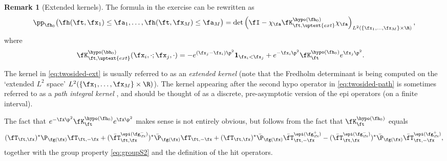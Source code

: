 \documentclass[]{pcmi}
\theoremstyle{plain}
\theoremstyle{definition}
\newtheorem{remark}[equation]{Remark}
\newcommand{\uno}[1]{\mathbf{1}_{#1}}
\begin{document}
\begin{remark}[Extended kernels]
The formula in the exercise can be rewritten as
\begin{equation}\label{eq:twosided-ext}
\pp_{\fh_0} \bigl(\fh(\ft,\fx_1)\leq\fa_1,\ldots,\fh(\ft,\fx_M)\leq\fa_M\bigr)=\det\left(\fI-\chi_{\fa}\fK^{\hypo(\fh_0)}_{\ft,\uptext{ext}}\chi_{\fa}\right)_{L^2(\{\fx_1,\ldots,\fx_M\}\times\R)},
\end{equation}
where
\begin{align}
\fK^{\hypo(\bh_0)}_{\ft,\uptext{ext}}(\fx_i,\cdot;\fx_j,\cdot)&=-e^{(\fx_j-\fx_i)\p^2}\uno{\fx_i<\fx_j}+e^{-\fx_i\p^2}\fK^{\hypo(\fh_0)}_\ft e^{\fx_j\p^2}.\label{eq:Khypo-ext}
\end{align}

The kernel in \eqref{eq:twosided-ext} is usually referred to as an \emph{extended kernel} (note that the Fredholm determinant is being computed on the `extended $L^2$ space' $L^2(\{\fx_1,\ldots,\fx_M\}\times\R)$).
The kernel appearing after the second hypo operator in \eqref{eq:twosided-path} is sometimes referred to as a \emph{path integral kernel} \cite{bcr}, and should be thought of as a discrete, pre-asymptotic version of the epi operators (on a finite interval).

The fact that $e^{-\fx\p^2}\fK^{\hypo(\fh_0)}_{\ft}e^{\fx\p^2}$ makes sense is not entirely obvious, but follows from the fact that
$\fK^{\hypo(\fh_0)}_{\ft}$ equals
\begin{equation}\label{eq:Kep-expansion}
 (\fT_{\ft,\fx} )^*\P_{\fg(\fx)}\fT_{\ft,-\fx} + ( \bar{\fT}^{\epi(\fg^-_\fx)}_{\ft,\fx} )^*\bar\P_{\fg(\fx)}
\fT_{\ft,-\fx} +  (\fT_{\ft,\fx} )^* \bar\P_{\fg(\fx)}
\bar{\fT}^{\epi(\fg^+_\fx)}_{\ft,-\fx}
 - ( \bar{\fT}^{\epi(\fg^-_\fx)}_{\ft,\fx} )^* \bar\P_{\fg(\fx)}
\bar{\fT}^{\epi(\fg^+_\fx)}_{\ft,-\fx},
\end{equation}
together with the group property \eqref{eq:groupS2}  and the definition of the hit operators.
\end{remark}
\end{document}
